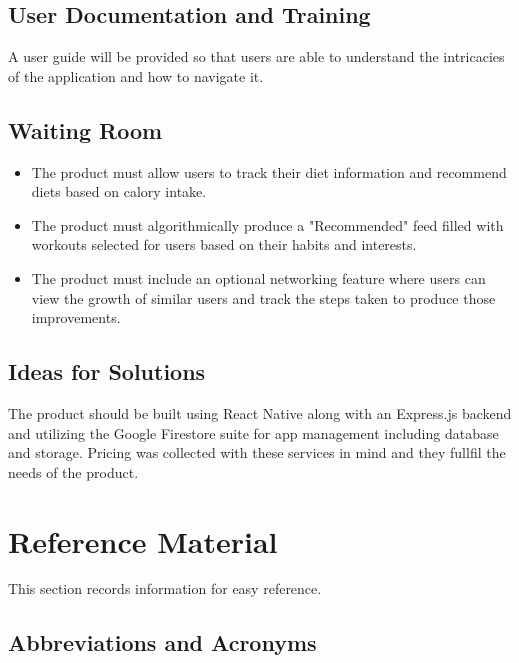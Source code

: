 \documentclass[12pt]{article}
\begin{document}
		\subsection{User Documentation and Training}
			A user guide will be provided so that users are able to understand the intricacies of the application and how to navigate it.
		\subsection{Waiting Room}
			\begin{itemize}
			\item The product must allow users to track their diet information and recommend diets based on calory intake.
			\item The product must algorithmically produce a "Recommended" feed filled with workouts selected for users based on their habits and interests.
			\item The product must include an optional networking feature where users can view the growth of similar users and track the steps taken to produce those improvements.
			\end{itemize}
		\subsection{Ideas for Solutions}
			The product should be built using React Native along with an Express.js backend and utilizing the Google Firestore suite for app management including database and storage. Pricing was collected with these services in mind and they fullfil the needs of the product.

	
	
	
	\section{Reference Material}
	
	This section records information for easy reference.
	
	
	\subsection{Abbreviations and Acronyms}
	
\end{document}
